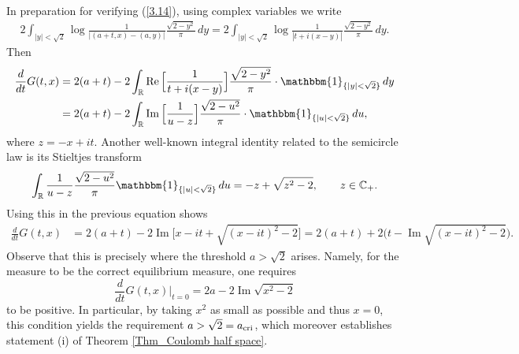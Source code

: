 \documentclass[10pt]{amsart}
\def\C{\mathbb{C}}
\def\R{\mathbb{R}}
\newcommand{\re}{\operatorname{Re}}
\newcommand{\im}{\operatorname{Im}}
\theoremstyle{plain}
\theoremstyle{remark}
\numberwithin{equation}{section}
\begin{document}
In preparation for verifying (\ref{3.14}), using complex variables we write 
\begin{align} \label{3.15}
 2 \int_{ |y|<\sqrt{2} } \log \frac{1}{ |(a+t,x)-(a,y)| } \frac{ \sqrt{2-y^2} }{\pi}\,dy =  2 \int_{ |y|<\sqrt{2} } \log \frac{1}{ |t+i(x-y)| } \frac{ \sqrt{2-y^2} }{\pi}\,dy. 
\end{align}
Then 
\begin{align*}
\frac{d}{dt} G(t,x)&= 2(a+t)  -2 \int_\R \re \Big[ \frac{1}{t+i(x-y)} \Big]  \frac{ \sqrt{ 2-y^2 } }{ \pi } \cdot \mathbbm{1}_{ \{ |y|<\sqrt{ 2 } \} } \,dy
\\
&=  2(a+t)  -2  \int_\R \im \Big[ \frac{1}{u-z} \Big]   \frac{ \sqrt{ 2-u^2 } }{ \pi } \cdot \mathbbm{1}_{ \{ |u|<\sqrt{ 2 } \} } \,du  ,
\end{align*}
where  $z=-x+it$.  
Another well-known integral identity related to the semicircle law is its Stieltjes transform 
\begin{align}\label{3.16+}
\int_{\mathbb R} \frac{1}{u-z} \frac{ \sqrt{2-u^2} }{ \pi } \mathbbm{1}_{ \{ |u| < \sqrt{2} \}  } \,du= -z+\sqrt{z^2-2}, \qquad z \in \C_+. 
\end{align}
Using this in the previous equation shows
\begin{align}\label{3.16a}
\frac{d}{dt} G(t,x) &= 2(a+t)  - 2 \im \Big[ x-it+\sqrt{ (x-it)^2-2 } \Big] = 2(a+t) +2  \Big( t- \im  \sqrt{ (x-it)^2-2 } \Big). 
\end{align} 
Observe that this is precisely where the threshold \( a > \sqrt{2} \) arises.  
Namely, for the measure to be the correct equilibrium measure, one requires  
$$
\frac{d}{dt} G(t,x)\Big|_{t=0}= 2a-2\im \sqrt{x^2-2} 
$$ 
to be positive. In particular, by taking $x^2$ as small as possible and thus \( x = 0 \), this condition yields the requirement \( a > \sqrt{2}= a_{\rm cri} \), which moreover establishes statement (i) of
Theorem \ref{Thm_Coulomb half space}.
\end{document}
